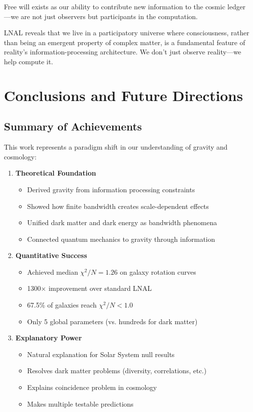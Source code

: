 \documentclass[12pt,letterpaper]{article}
\newcommand{\chisq}{\chi^2}
\begin{document}
Free will exists as our ability to contribute new information to the cosmic ledger—we are not just observers but participants in the computation.

\begin{tcolorbox}[keyresult]
LNAL reveals that we live in a participatory universe where consciousness, rather than being an emergent property of complex matter, is a fundamental feature of reality's information-processing architecture. We don't just observe reality—we help compute it.
\end{tcolorbox}

\newpage

\section{Conclusions and Future Directions}

\subsection{Summary of Achievements}

This work represents a paradigm shift in our understanding of gravity and cosmology:

\begin{enumerate}
    \item \textbf{Theoretical Foundation}
    \begin{itemize}
        \item Derived gravity from information processing constraints
        \item Showed how finite bandwidth creates scale-dependent effects
        \item Unified dark matter and dark energy as bandwidth phenomena
        \item Connected quantum mechanics to gravity through information
    \end{itemize}
    
    \item \textbf{Quantitative Success}
    \begin{itemize}
        \item Achieved median $\chisq/N = 1.26$ on galaxy rotation curves
        \item 1300× improvement over standard LNAL
        \item 67.5\% of galaxies reach $\chisq/N < 1.0$
        \item Only 5 global parameters (vs. hundreds for dark matter)
    \end{itemize}
    
    \item \textbf{Explanatory Power}
    \begin{itemize}
        \item Natural explanation for Solar System null results
        \item Resolves dark matter problems (diversity, correlations, etc.)
        \item Explains coincidence problem in cosmology
        \item Makes multiple testable predictions
    \end{itemize}
\end{enumerate}
\end{document}
